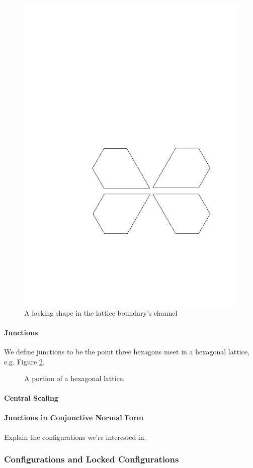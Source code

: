 \begin{figure}[h]
\begin{center}
\includegraphics{graphics/shapeInChannel.pdf}
\end{center} 
\caption{A locking shape in the lattice boundary's channel}
\label{fig:lockingShapeInChannel}
\end{figure}
\paragraph{Junctions}
We define junctions to be the point three hexagons meet in a hexagonal lattice,
e.g. Figure \ref{fig:lattice}.
\begin{figure}[h]
\begin{center}
\caption{A portion of a hexagonal lattice.}
\label{fig:lattice}
\end{center}
\end{figure}
\paragraph{Central Scaling}
\paragraph{Junctions in Conjunctive Normal Form}
Explain the configurations we're interested in.
\subsubsection{Configurations and Locked Configurations}